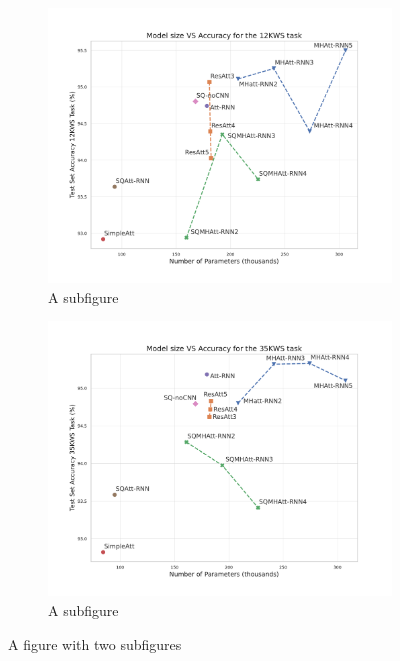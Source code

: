 \begin{figure}
	\centering
	\begin{subfigure}{.5\textwidth}
		\centering
		\includegraphics[width=\linewidth]{imgs/size_vs_accuracy12.pdf}
		\caption{A subfigure}
		\label{fig:sub1}
	\end{subfigure}%
	\begin{subfigure}{.5\textwidth}
		\centering
		\includegraphics[width=\linewidth]{imgs/size_vs_accuracy35.pdf}
		\caption{A subfigure}
		\label{fig:sub2}
	\end{subfigure}
	\caption{A figure with two subfigures}
	\label{fig:accs_vs_parameters}
\end{figure}

